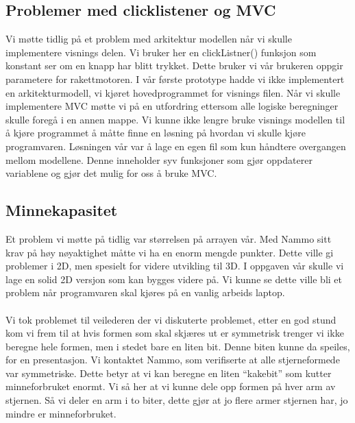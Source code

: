 \subsection{Problemer med clicklistener og MVC}
Vi møtte tidlig på et problem med arkitektur modellen når vi skulle implementere visnings delen. Vi bruker her en clickListner() funksjon som konstant ser om en knapp har blitt trykket. Dette bruker vi vår brukeren oppgir parametere for rakettmotoren. I vår første prototype hadde vi ikke implementert en arkitekturmodell, vi kjøret hovedprogrammet for visnings filen. Når vi skulle implementere MVC møtte vi på en utfordring ettersom alle logiske beregninger skulle foregå i en annen mappe. Vi kunne ikke lengre bruke visnings modellen til å kjøre programmet å måtte finne en løsning på hvordan vi skulle kjøre programvaren. Løsningen vår var å lage en egen fil som kun håndtere overgangen mellom modellene. Denne inneholder syv funksjoner som gjør oppdaterer variablene og gjør det mulig for oss å bruke MVC.


\subsection{Minnekapasitet}
Et problem vi møtte på tidlig var størrelsen på arrayen vår. Med Nammo sitt krav på høy nøyaktighet måtte vi ha en enorm mengde punkter. Dette ville gi problemer i 2D, men spesielt for videre utvikling til 3D. I oppgaven vår skulle vi lage en solid 2D versjon som kan bygges videre på. Vi kunne se dette ville bli et problem når programvaren skal kjøres på en vanlig arbeids laptop.\\ \\
Vi tok problemet til veilederen der vi diskuterte problemet, etter en god stund kom vi frem til at hvis formen som skal skjæres ut er symmetrisk trenger vi ikke beregne hele formen, men i stedet bare en liten bit. Denne biten kunne da speiles, for en presentasjon. Vi kontaktet Nammo, som verifiserte at alle stjerneformede var symmetriske. Dette betyr at vi kan beregne en liten “kakebit” som kutter minneforbruket enormt. Vi så her at vi kunne dele opp formen på hver arm av stjernen. Så vi deler en arm i to biter, dette gjør at jo flere armer stjernen har, jo mindre er minneforbruket.



